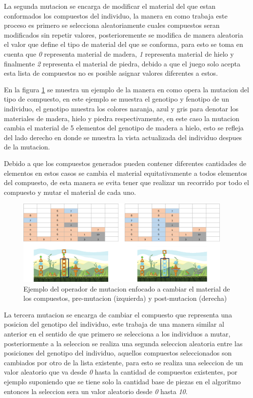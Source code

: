 La segunda mutacion se encarga de modificar el material del que estan
conformados los compuestos del individuo, la manera en como trabaja este proceso
es primero se selecciona aleatoriamente cuales compuestos seran modificados sin
repetir valores, posterioremente se modifica de manera aleatoria el valor que
define el tipo de material del que se conforma, para esto se toma en cuenta que
\textit{0} representa material de madera, \textit{1} representa material de
hielo y finalmente \textit{2} representa el material de piedra, debido a que el
juego solo acepta esta lista de compuestos no es posible asignar valores
diferentes a estos.

En la figura \ref{figure:mutate_material} se muestra un ejemplo de la manera en
como opera la mutacion del tipo de compuesto, en este ejemplo se muestra el
genotipo y fenotipo de un individuo, el genotipo muestra los colores naranja,
azul y gris para denotar los materiales de madera, hielo y piedra
respectivamente, en este caso la mutacion cambia el material de 5 elementos del
genotipo de madera a hielo, esto se refleja del lado derecho en donde se muestra
la vista actualizada del individuo despues de la mutacion.

Debido a que los compuestos generados pueden contener diferentes cantidades de
elementos en estos casos se cambia el material equitativamente a todos elementos
del compuesto, de esta manera se evita tener que realizar un recorrido por todo
el compuesto y mutar el material de cada uno.

\begin{figure}
  \centering
  \includegraphics[width=0.95\textwidth]{img/mutation_material.png}
  \caption{Ejemplo del operador de mutacion enfocado a cambiar el material de los compuestos, pre-mutacion (izquierda) y post-mutacion (derecha)}
  \label{figure:mutate_material}
\end{figure}

La tercera mutacion se encarga de cambiar el compuesto que representa una
posicion del genotipo del individuo, este trabaja de una manera similar al
anterior en el sentido de que primero se selecciona a los individuos a mutar,
posteriormente a la seleccion se realiza una segunda seleccion aleatoria entre
las posiciones del genotipo del individuo, aquellos compuestos seleccionados son
cambiados por otro de la lista existente, para esto se realiza una seleccion de
un valor aleatorio que va desde \textit{0} hasta la cantidad de compuestos
existentes, por ejemplo suponiendo que se tiene solo la cantidad base de piezas
en el algoritmo entonces la seleccion sera un valor aleatorio desde \textit{0}
hasta \textit{10}.

